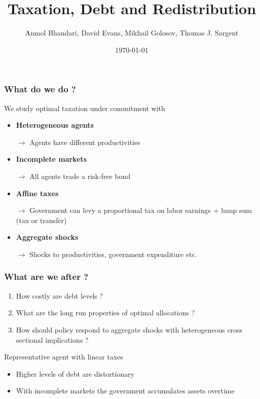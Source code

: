 \documentclass{beamer}
\title {Taxation, Debt and Redistribution}
\author{Anmol Bhandari, David Evans, Mikhail Golosov, Thomas J. Sargent}
\date{\today}
\begin{document}
%
\begin{frame}
\titlepage

\end{frame}

\begin{frame}
\frametitle{What do we do ?}
We study optimal taxation under commitment with
\begin{itemize}
 \item \textbf{Heterogeneous agents}
 
 \quad \color{red}$\rightarrow$ \color{black}Agents  have different productivities
 
 \item \textbf{Incomplete markets}
 
 \quad \color{red}$\rightarrow$ \color{black}All agents trade a risk-free bond
 
 \item \textbf{Affine taxes}
 
 \quad \color{red}$\rightarrow$ \color{black}Government can levy a proportional tax on labor earnings + lump sum (tax or transfer) 
 
 \item \textbf{Aggregate shocks}
 
 \quad \color{red}$\rightarrow$ \color{black}Shocks to productivities, government expenditure etc.

 \end{itemize}
\end{frame}


\begin{frame}
\frametitle{What are we after ?}

\begin{enumerate}
 \item How costly are debt levels ?
 \item What are the long run properties of optimal allocations ?
\item How should policy respond to aggregate shocks with heterogeneous cross sectional implications ?
\end{enumerate}
 Representative agent with linear taxes
\begin{itemize}
 \item Higher levels of debt are distortionary
 \item With incomplete markets the government accumulates assets overtime
 \end{itemize}
 
 \end{frame}
 
\end{document}
